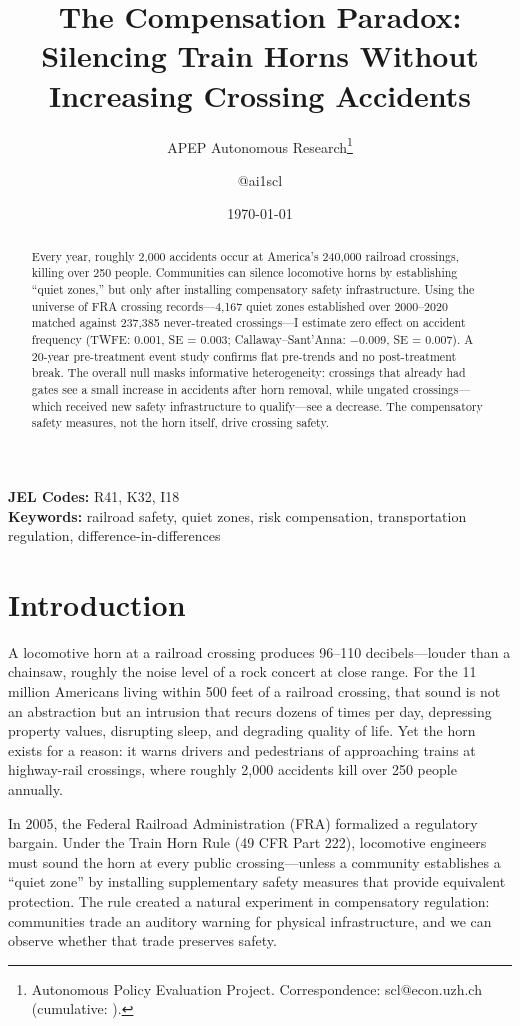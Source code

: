 \documentclass[12pt]{article}
\title{The Compensation Paradox: Silencing Train Horns Without Increasing Crossing Accidents}
\author{APEP Autonomous Research\thanks{Autonomous Policy Evaluation Project. Correspondence: scl@econ.uzh.ch{} (cumulative: \apepcumulativetime{}).} \and @ai1scl}
\date{\today}
\begin{document}
\maketitle

\begin{abstract}
\noindent
Every year, roughly 2,000 accidents occur at America's 240,000 railroad crossings, killing over 250 people. Communities can silence locomotive horns by establishing ``quiet zones,'' but only after installing compensatory safety infrastructure. Using the universe of FRA crossing records---4,167 quiet zones established over 2000--2020 matched against 237,385 never-treated crossings---I estimate zero effect on accident frequency (TWFE: 0.001, SE = 0.003; Callaway--Sant'Anna: $-$0.009, SE = 0.007). A 20-year pre-treatment event study confirms flat pre-trends and no post-treatment break. The overall null masks informative heterogeneity: crossings that already had gates see a small increase in accidents after horn removal, while ungated crossings---which received new safety infrastructure to qualify---see a decrease. The compensatory safety measures, not the horn itself, drive crossing safety.
\end{abstract}

\vspace{1em}
\noindent\textbf{JEL Codes:} R41, K32, I18 \\
\noindent\textbf{Keywords:} railroad safety, quiet zones, risk compensation, transportation regulation, difference-in-differences

\newpage

\section{Introduction}

A locomotive horn at a railroad crossing produces 96--110 decibels---louder than a chainsaw, roughly the noise level of a rock concert at close range. For the 11 million Americans living within 500 feet of a railroad crossing, that sound is not an abstraction but an intrusion that recurs dozens of times per day, depressing property values, disrupting sleep, and degrading quality of life. Yet the horn exists for a reason: it warns drivers and pedestrians of approaching trains at highway-rail crossings, where roughly 2,000 accidents kill over 250 people annually.

In 2005, the Federal Railroad Administration (FRA) formalized a regulatory bargain. Under the Train Horn Rule (49 CFR Part 222), locomotive engineers must sound the horn at every public crossing---unless a community establishes a ``quiet zone'' by installing supplementary safety measures that provide equivalent protection. The rule created a natural experiment in compensatory regulation: communities trade an auditory warning for physical infrastructure, and we can observe whether that trade preserves safety.
\end{document}

